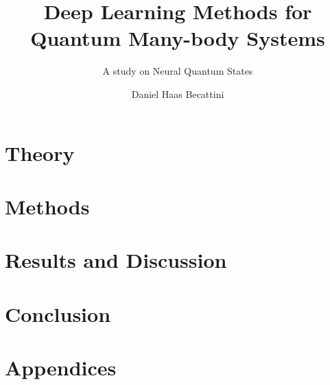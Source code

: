 \documentclass[11pt, a4paper, english]{report}
\author{Daniel Haas Becattini}
\title{\textbf{Deep Learning Methods for Quantum Many-body Systems}}
\subtitle{A study on Neural Quantum States}
\begin{document}
\uiomasterfp[program={Computational Sciences: Physics},
dept={Department of Physics}]




\tableofcontents
\newpage

  
%  

\part{Theory}\label{part:theory}



\part{Methods}\label{part:methods}

\part{Results and Discussion}\label{part:results}


\part{Conclusion}\label{part:conclusion}

\part{Appendices}

\newpage


\end{document}
